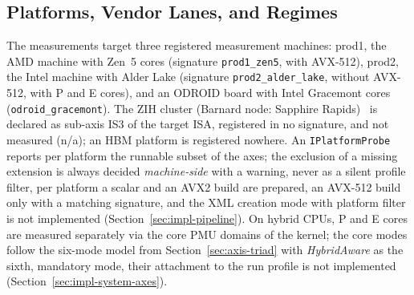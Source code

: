 \begin{nurkurz}
\subsection{Platforms, Vendor Lanes, and Regimes}\label{sec:eval-platforms}
The measurements target three registered measurement machines: prod1, the AMD machine with Zen~5 cores
(signature \texttt{prod1\_zen5}, with AVX-512), prod2, the Intel machine with Alder Lake (signature
\texttt{prod2\_alder\_lake}, without AVX-512, with P and E cores), and an ODROID board with Intel Gracemont
cores (\texttt{odroid\_gracemont}). The ZIH cluster (Barnard node: Sapphire
Rapids)~\cite{zih_hpc_compendium_hardware} is declared as sub-axis IS3 of the target ISA, registered in no
signature, and not measured (n/a); an HBM platform is registered nowhere. An \texttt{IPlatformProbe} reports
per platform the runnable subset of the axes; the exclusion of a missing extension is always decided
\emph{machine-side} with a warning, never as a silent profile filter, per platform a scalar and an AVX2
build are prepared, an AVX-512 build only with a matching signature, and the XML creation mode with platform
filter is not implemented (Section~\ref{sec:impl-pipeline}). On hybrid CPUs, P and E cores are measured
separately via the core PMU domains of the kernel; the core modes follow the six-mode model from
Section~\ref{sec:axis-triad} with \emph{HybridAware} as the sixth, mandatory mode, their attachment to the
run profile is not implemented (Section~\ref{sec:impl-system-axes}).
\end{nurkurz}

